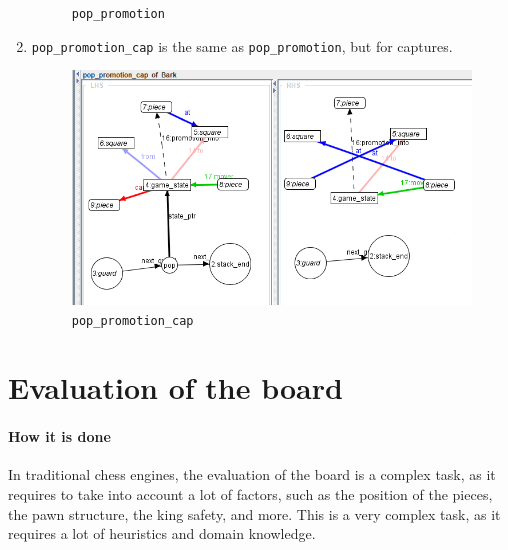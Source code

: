\documentclass[a4paper, 10pt]{scrartcl}
\begin{document}
\begin{enumerate}
\begin{figure}[H]
            \caption{\texttt{pop\_promotion}}
        \end{figure}
        \item \texttt{pop\_promotion\_cap} is the same as \texttt{pop\_promotion}, but for captures.
        \begin{figure}[H]
            \centering
            \includegraphics[width=.8\linewidth]{images/pop_promotion_cap.png}
            \caption{\texttt{pop\_promotion\_cap}}
        \end{figure}
    \end{enumerate}

    \section{Evaluation of the board}
    \paragraph*{How it is done} In traditional chess engines, the evaluation of the board is a complex task, as it requires to take into account a lot of factors, such as the position of the pieces, the pawn structure, the king safety, and more. This is a very complex task, as it requires a lot of heuristics and domain knowledge.
    
\end{document}
